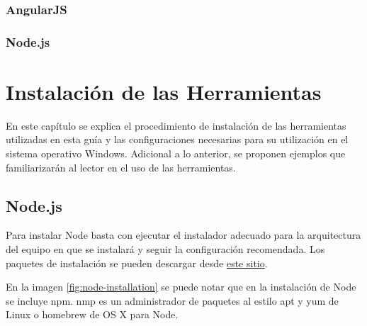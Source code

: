 \documentclass[10pt,a4paper]{report}
\begin{document}
\subsection{AngularJS}

\subsection{Node.js}
%


\chapter{Instalación de las Herramientas}

En este capítulo se explica el procedimiento de instalación de las herramientas utilizadas en esta guía y las configuraciones necesarias para su utilización en el sistema operativo Windows. Adicional a lo anterior, se proponen ejemplos que familiarizarán al lector en el uso de las herramientas.

\section{Node.js}

Para instalar Node basta con ejecutar el instalador adecuado para la arquitectura del equipo en que se instalará y seguir la configuración recomendada. Los paquetes de instalación se pueden descargar desde \href{https://nodejs.org/en/download/}{este sitio}.

En la imagen \ref{fig:node-installation} se puede notar que en la instalación de Node se incluye npm. nmp es un administrador de paquetes al estilo apt y yum de Linux o homebrew de OS X para Node.
\end{document}
